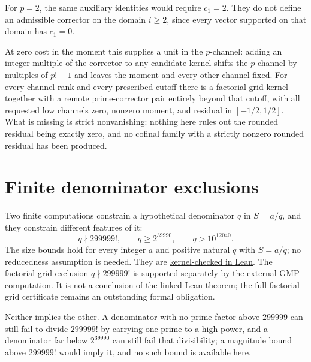 \documentclass[11pt]{article}
\newcommand{\Ser}{S}
\begin{document}
For $p=2$, the same auxiliary identities would require $c_1=2$.  They do
not define an admissible corrector on the domain $i\ge2$, since every vector
supported on that domain has $c_1=0$.

\noindent At zero cost in the moment this supplies a unit in the
$p$-channel: adding an integer multiple of the corrector to any candidate
kernel shifts the $p$-channel by multiples of $p!-1$ and leaves the moment
and every other channel fixed.  For every channel rank and every prescribed
cutoff there is a factorial-grid kernel together with a remote prime-corrector
pair entirely beyond that cutoff, with all requested low channels zero,
nonzero moment, and residual in $[-1/2,1/2]$.  What is missing is strict
nonvanishing: nothing here rules out the rounded residual being exactly zero,
and no cofinal family with a strictly nonzero rounded residual has been
produced.

\section{Finite denominator exclusions}\label{long68:sec:finite}
\label{long68:res:lead-denominator-exclusions}

Two finite computations constrain a hypothetical denominator $q$ in
$\Ser=a/q$, and they constrain different features of it:
\begin{equation}\label{long68:eq:finite-bounds}
 q\nmid299999!,\qquad q\ge2^{39990},\qquad q>10^{12040}.
\end{equation}
The size bounds hold for every integer $a$ and positive natural $q$ with
$\Ser=a/q$; no reducedness assumption is needed. They are
\href{https://github.com/wcook04/plectis-erdos/blob/25ef6245d15a47548c6926369ae8f1a0f0a14a80/ErdosProblems/Erdos68/PaperCompleteFiniteSizeCertificate.lean#L58}{kernel-checked in Lean}.
The factorial-grid exclusion $q\nmid299999!$ is supported separately by the
external GMP computation. It is not a conclusion of the linked Lean theorem;
the full factorial-grid certificate remains an outstanding formal obligation.

Neither implies the other.  A denominator with no prime factor above
$299999$ can still fail to divide $299999!$ by carrying one prime to a high
power, and a denominator far below $2^{39990}$ can still fail that
divisibility; a magnitude bound above $299999!$ would imply it, and no such
bound is available here.
\end{document}
